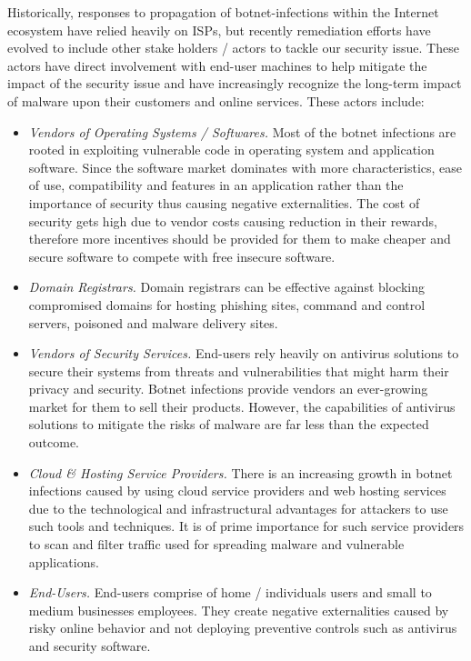 Historically, responses to propagation of botnet-infections within the Internet ecosystem have relied heavily on ISPs, but recently remediation efforts have evolved to include other stake holders / actors to tackle our security issue. These actors have direct involvement with end-user machines to help mitigate the impact of the security issue and have increasingly recognize the long-term impact of malware upon their customers and online services. These actors include:

\begin{itemize}
\item \textit{Vendors of Operating Systems / Softwares.} Most of the botnet infections are rooted in exploiting vulnerable code in operating system and application software. Since the software market dominates with more characteristics, ease of use, compatibility and features in an application rather than the importance of security thus causing negative externalities. The cost of security gets high due to vendor costs causing reduction in their rewards, therefore more incentives should be provided for them to make cheaper and secure software to compete with free insecure software.
\item \textit{Domain Registrars.} Domain registrars can be effective against blocking compromised domains for hosting phishing sites, command and control servers, poisoned and malware delivery sites.
\item \textit{Vendors of Security Services.} End-users rely heavily on antivirus solutions to secure their systems from threats and vulnerabilities that might harm their privacy and security. Botnet infections provide vendors an ever-growing market for them to sell their products. However, the capabilities of antivirus solutions to mitigate the risks of malware are far less than the expected outcome.
\item \textit{Cloud \& Hosting Service Providers.} There is an increasing growth in botnet infections caused by using cloud service providers and web hosting services due to the technological and infrastructural advantages for attackers to use such tools and techniques. It is of prime importance for such service providers to scan and filter traffic used for spreading malware and vulnerable applications.
\item \textit{End-Users.} End-users comprise of home / individuals users and small to medium businesses employees. They create negative externalities caused by risky online behavior and not deploying preventive controls such as antivirus and security software.
\end{itemize}
